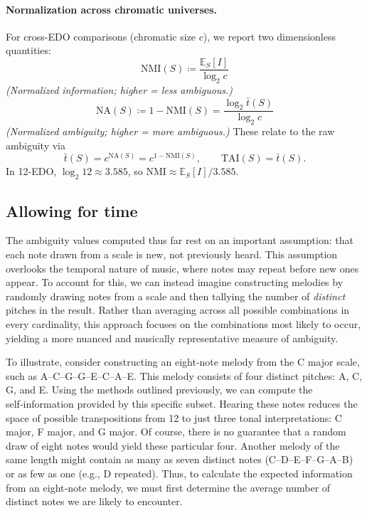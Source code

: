 \documentclass[10pt,twocolumn]{article}
\numberwithin{equation}{section} %
\begin{document}
    

    \paragraph{Normalization across chromatic universes.}
    For cross-EDO comparisons (chromatic size $c$), we report two dimensionless quantities:
    \[
        \mathrm{NMI}(S) \coloneqq \frac{\mathbb{E}_S[I]}{\log_2 c}
    \]
    \emph{(Normalized information; higher = less ambiguous.)}
    \[
        \mathrm{NA}(S) \coloneqq 1 - \mathrm{NMI}(S) = \frac{\log_2 \bar{t}(S)}{\log_2 c}
    \]
    \emph{(Normalized ambiguity; higher = more ambiguous.)}
    These relate to the raw ambiguity via
    \[
        \bar{t}(S) = c^{\mathrm{NA}(S)} = c^{1-\mathrm{NMI}(S)}, \qquad \mathrm{TAI}(S)=\bar{t}(S).
    \]
    In 12-EDO, $\log_2 12 \approx 3.585$, so $\mathrm{NMI}\approx \mathbb{E}_S[I]/3.585$.



    \subsection{Allowing for time}

    The ambiguity values computed thus far rest on an important assumption: that each note drawn from a scale is new, not previously heard.
    This assumption overlooks the temporal nature of music, where notes may repeat before new ones appear.
    To account for this, we can instead imagine constructing melodies by randomly drawing notes from a scale and then tallying the number of \textit{distinct} pitches in the result.
    Rather than averaging across all possible combinations in every cardinality, this approach focuses on the combinations most likely to occur, yielding a more nuanced and musically representative measure of ambiguity.

    To illustrate, consider constructing an eight‑note melody from the C major scale, such as A–C–G–G–E–C–A–E.
This melody consists of four distinct pitches: A, C, G, and E.
    Using the methods outlined previously, we can compute the self‑information provided by this specific subset.
    Hearing these notes reduces the space of possible transpositions from 12 to just three tonal interpretations: C major, F major, and G major.
    Of course, there is no guarantee that a random draw of eight notes would yield these particular four.
    Another melody of the same length might contain as many as seven distinct notes (C–D–E–F–G–A–B) or as few as one (e.g., D repeated).
    Thus, to calculate the expected information from an eight‑note melody, we must first determine the average number of distinct notes we are likely to encounter.
\end{document}
